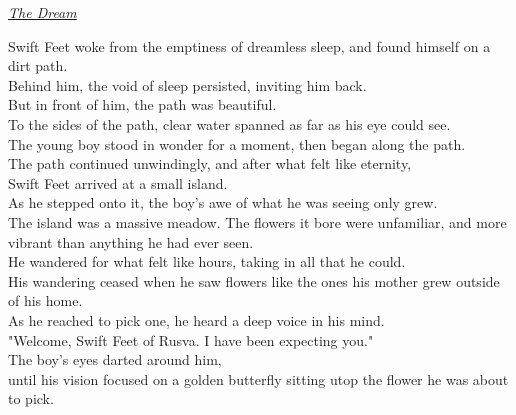 \documentclass{book}
\begin{document}
\centering
\underline{\textit{\LARGE{The Dream}}}
\vspace{.35 in}
\begin{Large}

Swift Feet woke from the emptiness of dreamless sleep, and found himself on a dirt path.\\
Behind him, the void of sleep persisted, inviting him back.\\
But in front of him, the path was beautiful.\\
To the sides of the path, clear water spanned as far as his eye could see.\\
The young boy stood in wonder for a moment, then began along the path.\\
\vspace{.25 in}
The path continued unwindingly, and after what felt like eternity,\\
Swift Feet arrived at a small island.\\
As he stepped onto it, the boy's awe of what he was seeing only grew.\\
The island was a massive meadow. The flowers it bore were unfamiliar, and more vibrant than anything he had ever seen.\\
\vspace{.25 in}
He wandered for what felt like hours, taking in all that he could.\\
His wandering ceased when he saw flowers like the ones his mother grew outside of his home.\\
As he reached to pick one, he heard a deep voice in his mind.\\
\vspace{.25 in}
"Welcome, Swift Feet of Rusva. I have been expecting you."\\
The boy's eyes darted around him,\\
until his vision focused on a golden butterfly sitting utop the flower he was about to pick.\\





\end{Large}
\end{document}
